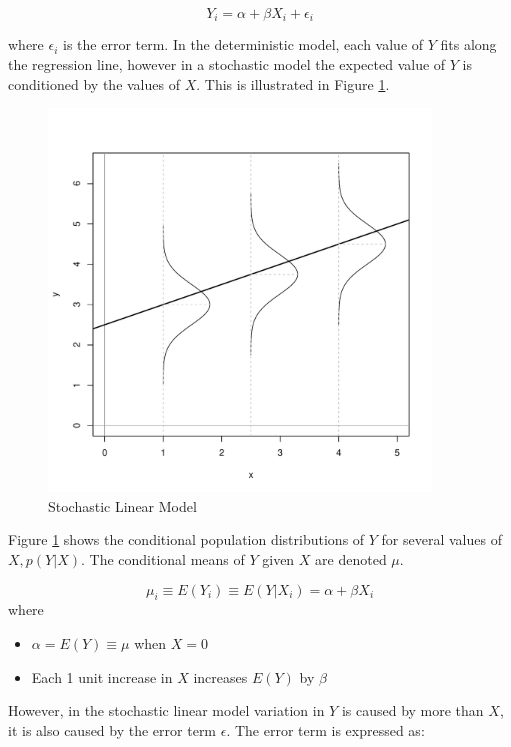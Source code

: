 \documentclass[11pt,openany]{book}\usepackage[]{graphicx}\usepackage[]{color}
\begin{document}
\begin{equation}
  \label{eq:theolm}
Y_{i} = \alpha + \beta X_{i} + \epsilon_i
\end{equation}

\noindent where $\epsilon_i$ is the error term. In the deterministic model, each value of $Y$ fits along the regression line, however in a stochastic model the expected value of $Y$ is conditioned by the values of $X$. This is illustrated in Figure \ref{sols}. 



\begin{figure}
  \centering
  \includegraphics[width=4in]{07_OLSlogic/stochastic.pdf}%
  \caption{Stochastic Linear Model \label{sols}}
\end{figure}

Figure \ref{sols} shows the conditional population distributions of $Y$ for several values of $X, p(Y|X)$. The conditional means of $Y$ given $X$ are denoted $\mu$.  

\begin{equation} 
\mu_{i} \equiv E(Y_{i}) \equiv E(Y|X_{i})=\alpha+\beta X_{i} 
\end{equation} 
\noindent where 
\begin{itemize}
\item $\alpha = E(Y) \equiv \mu$ when $X=0$
\item Each 1 unit increase in $X$ increases $E(Y)$ by $\beta$
\end{itemize}

However, in the stochastic linear model variation in $Y$ is caused by more than $X$, it is also caused by the error term $\epsilon$.   The error term is expressed as: 
\end{document}

